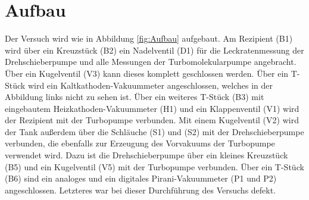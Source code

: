 
\section{Aufbau}
\label{sec:Aufbau}

Der Versuch wird wie in Abbildung \ref{fig:Aufbau} aufgebaut. Am Rezipient (B1) wird über ein Kreuzstück (B2) ein Nadelventil (D1) für die Leckratenmessung der Drehschieberpumpe und alle Messungen der Turbomolekularpumpe angebracht. Über ein Kugelventil (V3) kann dieses komplett geschlossen werden. Über ein T-Stück wird ein Kaltkathoden-Vakuummeter angeschlossen, welches in der Abbildung links nicht zu sehen ist. Über ein weiteres T-Stück (B3) mit eingebautem Heizkathoden-Vakuummeter (H1) und ein Klappenventil (V1) wird der Rezipient mit der Turbopumpe verbunden. Mit einem Kugelventil (V2) wird der Tank außerdem über die Schläuche (S1) und (S2) mit der Drehschieberpumpe verbunden, die ebenfalls zur Erzeugung des Vorvakuums der Turbopumpe verwendet wird. Dazu ist die Drehschieberpumpe über ein kleines Kreuzstück (B5) und ein Kugelventil (V5) mit der Turbopumpe verbunden. Über ein T-Stück (B6) sind ein analoges und ein digitales Pirani-Vakuummeter (P1 und P2) angeschlossen. Letzteres war bei dieser Durchführung des Versuchs defekt.

